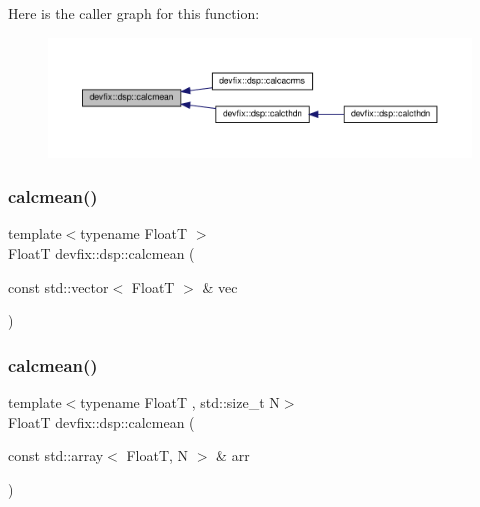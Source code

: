 Here is the caller graph for this function\+:
\nopagebreak
\begin{figure}[H]
\begin{center}
\leavevmode
\includegraphics[width=350pt]{namespacedevfix_1_1dsp_acc73b4642ca4cb49621e76efc6732186_icgraph}
\end{center}
\end{figure}
\mbox{\label{namespacedevfix_1_1dsp_ab8e51dea953cabfc246e2e45fbff010c}} 
\subsubsection{\texorpdfstring{calcmean()}{calcmean()}\hspace{0.1cm}{\footnotesize\ttfamily [2/3]}}
{\footnotesize\ttfamily template$<$typename FloatT $>$ \\
FloatT devfix\+::dsp\+::calcmean (\begin{DoxyParamCaption}\item[{const std\+::vector$<$ FloatT $>$ \&}]{vec }\end{DoxyParamCaption})}

\mbox{\label{namespacedevfix_1_1dsp_a9f44af4b1a42d61d8a52afb7a5628001}} 
\subsubsection{\texorpdfstring{calcmean()}{calcmean()}\hspace{0.1cm}{\footnotesize\ttfamily [3/3]}}
{\footnotesize\ttfamily template$<$typename FloatT , std\+::size\+\_\+t N$>$ \\
FloatT devfix\+::dsp\+::calcmean (\begin{DoxyParamCaption}\item[{const std\+::array$<$ FloatT, N $>$ \&}]{arr }\end{DoxyParamCaption})}

